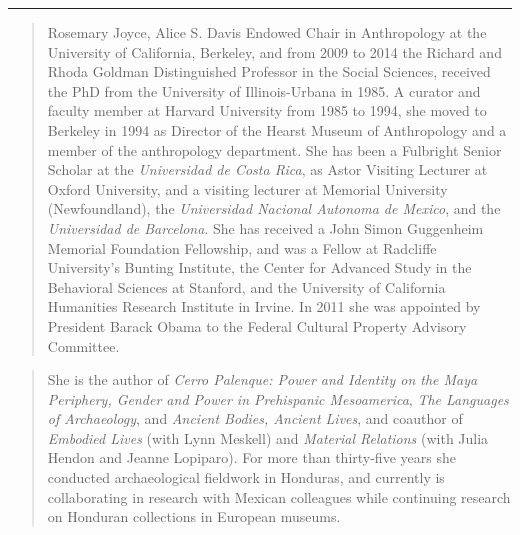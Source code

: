 \noindent\rule[0.5ex]{\linewidth}{1pt}

\blockquote{Rosemary Joyce, Alice S. Davis Endowed Chair in Anthropology at the University of California, Berkeley, and from 2009 to 2014 the Richard and Rhoda Goldman Distinguished Professor in the Social Sciences, received the PhD from the University of Illinois-Urbana in 1985. A curator and faculty member at Harvard University from 1985 to 1994, she moved to Berkeley in 1994 as Director of the Hearst Museum of Anthropology and a member of the anthropology department. She has been a Fulbright Senior Scholar at the \emph{Universidad de Costa Rica}, as Astor Visiting Lecturer at Oxford University, and a visiting lecturer at Memorial University (Newfoundland), the \emph{Universidad Nacional Autonoma de Mexico}, and the \emph{Universidad de Barcelona}. She has received a John Simon Guggenheim Memorial Foundation Fellowship, and was a Fellow at Radcliffe University's Bunting Institute, the Center for Advanced Study in the Behavioral Sciences at Stanford, and the University of California Humanities Research Institute in Irvine. In 2011 she was appointed by President Barack Obama to the Federal Cultural Property Advisory Committee.}

\blockquote{She is the author of \emph{Cerro Palenque: Power and Identity on the Maya Periphery, Gender and Power in Prehispanic Mesoamerica}, \emph{The Languages of Archaeology}, and \emph{Ancient Bodies, Ancient Lives}, and coauthor of \emph{Embodied Lives} (with Lynn Meskell) and \emph{Material Relations} (with Julia Hendon and Jeanne Lopiparo). For more than thirty-five years she conducted archaeological fieldwork in Honduras, and currently is collaborating in research with Mexican colleagues while continuing research on Honduran collections in European museums.}

	\label{Johnson:lastpage}
\closingarticle